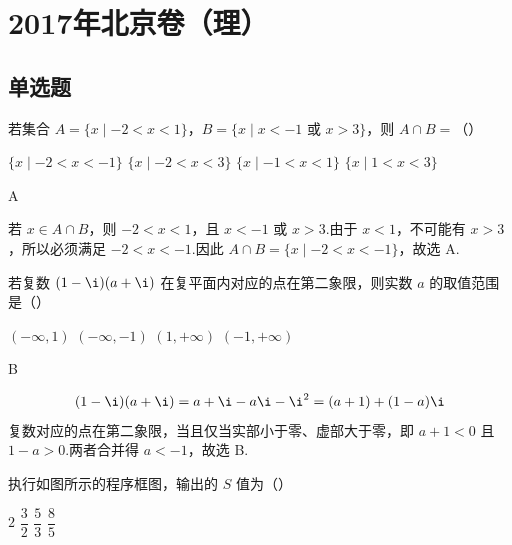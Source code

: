 \chapter{2017年北京卷（理）}

\section{单选题}

\begin{problem}
若集合 \(A=\{x\mid -2<x<1\}\)，\(B=\{x\mid x<-1\text{ 或 }x>3\}\)，则 \(A\cap B=\)（\quad）

\choices
    {\(\{x\mid -2<x<-1\}\)}
    {\(\{x\mid -2<x<3\}\)}
    {\(\{x\mid -1<x<1\}\)}
    {\(\{x\mid 1<x<3\}\)}
\end{problem}

\begin{answer}
A
\end{answer}

\begin{solution}
若 \(x\in A\cap B\)，则 \(-2<x<1\)，且 \(x<-1\) 或 \(x>3\).由于 \(x<1\)，不可能有 \(x>3\)，所以必须满足 \(-2<x<-1\).因此 \(A\cap B=\{x\mid -2<x<-1\}\)，故选 A.
\end{solution}

\begin{problem}
若复数 \((1-\i)(a+\i)\) 在复平面内对应的点在第二象限，则实数 \(a\) 的取值范围是（\quad）

\choices
    {\((-\infty,1)\)}
    {\((-\infty,-1)\)}
    {\((1,+\infty)\)}
    {\((-1,+\infty)\)}
\end{problem}

\begin{answer}
B
\end{answer}

\begin{solution}
\[
(1-\i)(a+\i)=a+\i-a\i-\i^2=(a+1)+(1-a)\i
\]
复数对应的点在第二象限，当且仅当实部小于零、虚部大于零，即 \(a+1<0\) 且 \(1-a>0\).两者合并得 \(a<-1\)，故选 B.
\end{solution}

\begin{problem}
执行如图所示的程序框图，输出的 \(S\) 值为（\quad）


\choices
    {\(2\)}
    {\(\dfrac32\)}
    {\(\dfrac53\)}
    {\(\dfrac85\)}
\end{problem}

